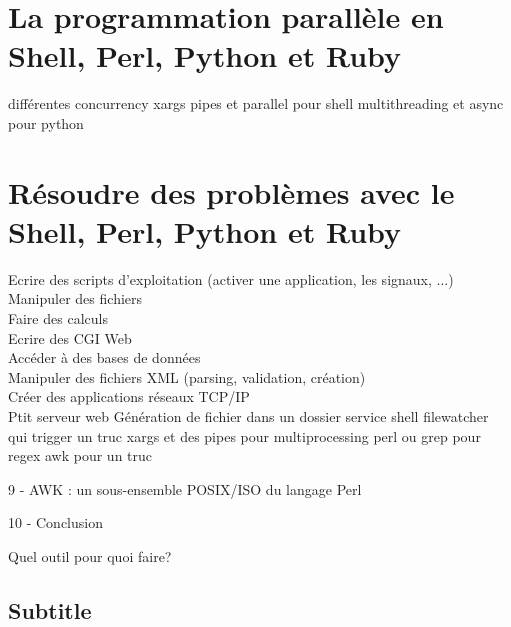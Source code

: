 \documentclass[11pt,a4paper]{article}
\begin{document}
\section{La programmation parallèle en Shell, Perl, Python et Ruby}

différentes concurrency
xargs pipes et parallel pour shell
multithreading et async pour python

\section{Résoudre des problèmes avec le Shell, Perl, Python et Ruby}

Ecrire des scripts d'exploitation (activer une application, les signaux, ...)\\
Manipuler des fichiers\\
Faire des calculs\\
Ecrire des CGI Web\\
Accéder à des bases de données\\
Manipuler des fichiers XML (parsing, validation, création)\\
Créer des applications réseaux TCP/IP\\

Ptit serveur web
Génération de fichier dans un dossier
service shell filewatcher qui trigger un truc
xargs et des pipes pour multiprocessing
perl ou grep pour regex
awk pour un truc

9 - AWK : un sous-ensemble POSIX/ISO du langage Perl

10 - Conclusion

Quel outil pour quoi faire?



\subsection*{Subtitle}
\end{document}
